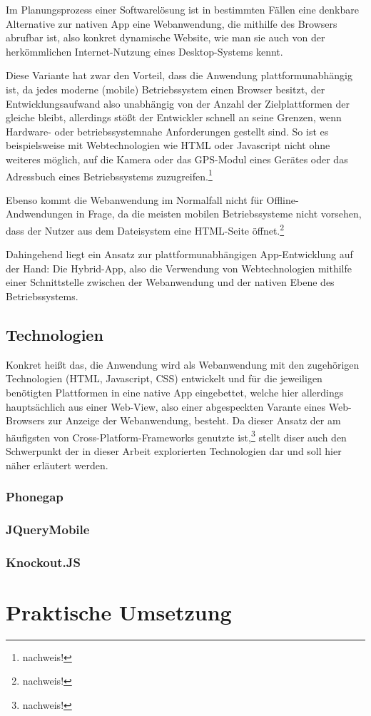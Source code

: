 \documentclass{scrreprt}
\begin{document}
Im Planungsprozess einer Softwarel\"osung ist in bestimmten F\"allen eine denkbare Alternative zur nativen App eine Webanwendung, die mithilfe des Browsers abrufbar ist, also konkret dynamische Website, wie man sie auch von der herk\"ommlichen Internet-Nutzung eines Desktop-Systems kennt. 

Diese Variante hat zwar den Vorteil, dass die Anwendung plattformunabh\"angig ist, da jedes moderne (mobile) Betriebssystem einen Browser besitzt, der Entwicklungsaufwand also unabh\"angig von der Anzahl der Zielplattformen der gleiche bleibt, allerdings st\"oßt der Entwickler schnell an seine Grenzen, wenn Hardware- oder betriebssystemnahe Anforderungen gestellt sind. So ist es beispielsweise mit Webtechnologien wie HTML oder Javascript nicht ohne weiteres m\"oglich, auf die Kamera oder das GPS-Modul eines Ger\"ates oder das Adressbuch eines Betriebssystems zuzugreifen.\footnote{nachweis!}

Ebenso kommt die Webanwendung im Normalfall nicht f\"ur Offline-Andwendungen in Frage, da die meisten mobilen Betriebssysteme nicht vorsehen, dass der Nutzer aus dem Dateisystem eine HTML-Seite \"offnet.\footnote{nachweis!}

Dahingehend liegt ein Ansatz zur plattformunabh\"angigen App-Entwicklung auf der Hand: Die Hybrid-App, also die Verwendung von Webtechnologien mithilfe einer Schnittstelle zwischen der Webanwendung und der nativen Ebene des Betriebssystems.

\section{Technologien}
Konkret heißt das, die Anwendung wird als Webanwendung mit den zugeh\"origen Technologien (HTML, Javascript, CSS) entwickelt und f\"ur die jeweiligen ben\"otigten Plattformen in eine native App eingebettet, welche hier allerdings haupts\"achlich aus einer Web-View, also einer abgespeckten Varante eines Web-Browsers zur Anzeige der Webanwendung, besteht. Da dieser Ansatz der am h\"aufigsten von Cross-Platform-Frameworks genutzte ist,\footnote{nachweis!} stellt diser auch den Schwerpunkt der in dieser Arbeit explorierten Technologien dar und soll hier n\"aher erl\"autert werden. 

\subsection{Phonegap}


\subsection{JQueryMobile}


\subsection{Knockout.JS}




\chapter{Praktische Umsetzung}
\end{document}
